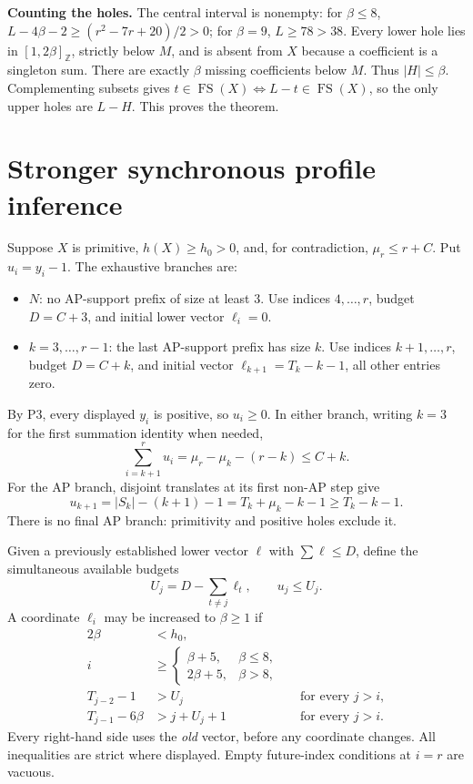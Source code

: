 \documentclass[11pt,a4paper]{article}
\newcommand{\FS}{\operatorname{FS}}
\newcommand{\Z}{\mathbb Z}
\newcommand{\ints}[2]{[#1,#2]_{\Z}}
\begin{document}
\textbf{Counting the holes.} The central interval is nonempty: for $\beta\le8$, $L-4\beta-2\ge(r^2-7r+20)/2>0$; for $\beta=9$, $L\ge78>38$. Every lower hole lies in $\ints1{2\beta}$, strictly below $M$, and is absent from $X$ because a coefficient is a singleton sum. There are exactly $\beta$ missing coefficients below $M$. Thus $|H|\le\beta$. Complementing subsets gives $t\in\FS(X)\iff L-t\in\FS(X)$, so the only upper holes are $L-H$. This proves the theorem.

\newpage
\section{Stronger synchronous profile inference}\label{profiles}
Suppose $X$ is primitive, $h(X)\ge h_0>0$, and, for contradiction, $\mu_r\le r+C$. Put $u_i=y_i-1$. The exhaustive branches are:
\begin{itemize}
\item $N$: no AP-support prefix of size at least $3$. Use indices $4,\ldots,r$, budget $D=C+3$, and initial lower vector $\ell_i=0$.
\item $k=3,\ldots,r-1$: the last AP-support prefix has size $k$. Use indices $k+1,\ldots,r$, budget $D=C+k$, and initial vector $\ell_{k+1}=T_k-k-1$, all other entries zero.
\end{itemize}
By P3, every displayed $y_i$ is positive, so $u_i\ge0$. In either branch, writing $k=3$ for the first summation identity when needed,
\[
\sum_{i=k+1}^r u_i=\mu_r-\mu_k-(r-k)\le C+k.
\]
For the AP branch, disjoint translates at its first non-AP step give
\[
u_{k+1}=|S_k|-(k+1)-1=T_k+\mu_k-k-1\ge T_k-k-1.
\]
There is no final AP branch: primitivity and positive holes exclude it.

Given a previously established lower vector $\ell$ with $\sum\ell\le D$, define the simultaneous available budgets
\[
U_j=D-\sum_{t\ne j}\ell_t,\qquad u_j\le U_j.
\]
A coordinate $\ell_i$ may be increased to $\beta\ge1$ if
\begin{align}
2\beta&<h_0,\label{rule1}\\
i&\ge\begin{cases}\beta+5,&\beta\le8,\\2\beta+5,&\beta>8,\end{cases}\label{rule2}\\
T_{j-2}-1&>U_j &&\text{for every }j>i,\label{rule3}\\
T_{j-1}-6\beta&>j+U_j+1 &&\text{for every }j>i.\label{rule4}
\end{align}
Every right-hand side uses the \emph{old} vector, before any coordinate changes. All inequalities are strict where displayed. Empty future-index conditions at $i=r$ are vacuous.
\end{document}
